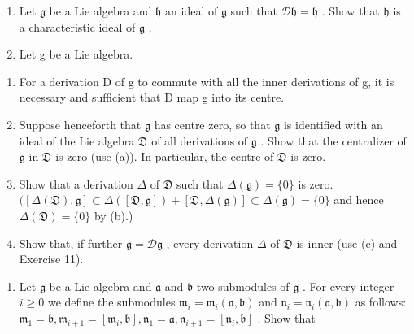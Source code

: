 \begin{enumerate}
\def\labelenumi{\arabic{enumi}.}
\setcounter{enumi}{10}
\item
  Let \(\mathfrak{g}\) be a Lie algebra and \(\mathfrak{h}\) an ideal of \(\mathfrak{g}\) such that \(\mathcal{D}\mathfrak{h} = \mathfrak{h}\) . Show that \(\mathfrak{h}\) is a characteristic ideal of \(\mathfrak{g}\) .
\item
  Let g be a Lie algebra.
\end{enumerate}

\begin{enumerate}
\def\labelenumi{(\alph{enumi})}
\item
  For a derivation D of g to commute with all the inner derivations of g, it is necessary and sufficient that D map g into its centre.
\item
  Suppose henceforth that \(\mathfrak{g}\) has centre zero, so that \(\mathfrak{g}\) is identified with an ideal of the Lie algebra \(\mathfrak{D}\) of all derivations of \(\mathfrak{g}\) . Show that the centralizer of \(\mathfrak{g}\) in \(\mathfrak{D}\) is zero (use (a)). In particular, the centre of \(\mathfrak{D}\) is zero.
\item
  Show that a derivation \(\Delta\) of \(\mathfrak{D}\) such that \(\Delta(\mathfrak{g}) = \{0\}\) is zero. \(([\Delta(\mathfrak{D}),\mathfrak{g}]\subset \Delta([\mathfrak{D},\mathfrak{g}]) + [\mathfrak{D},\Delta(\mathfrak{g})]\subset \Delta(\mathfrak{g}) = \{0\}\) and hence \(\Delta(\mathfrak{D}) = \{0\}\) by (b).)
\item
  Show that, if further \(\mathfrak{g} = \mathcal{D}\mathfrak{g}\) , every derivation \(\Delta\) of \(\mathfrak{D}\) is inner (use (c) and Exercise 11).
\end{enumerate}

\begin{enumerate}
\def\labelenumi{\arabic{enumi}.}
\setcounter{enumi}{12}
\tightlist
\item
  Let \(\mathfrak{g}\) be a Lie algebra and \(\mathfrak{a}\) and \(\mathfrak{b}\) two submodules of \(\mathfrak{g}\) . For every integer \(i \geqslant 0\) we define the submodules \(\mathfrak{m}_i = \mathfrak{m}_i(\mathfrak{a},\mathfrak{b})\) and \(\mathfrak{n}_i = \mathfrak{n}_i(\mathfrak{a},\mathfrak{b})\) as follows: \(\mathfrak{m}_1 = \mathfrak{b}, \mathfrak{m}_{i+1} = [\mathfrak{m}_i,\mathfrak{b}], \mathfrak{n}_1 = \mathfrak{a}, \mathfrak{n}_{i+1} = [\mathfrak{n}_i,\mathfrak{b}]\) . Show that
\end{enumerate}

